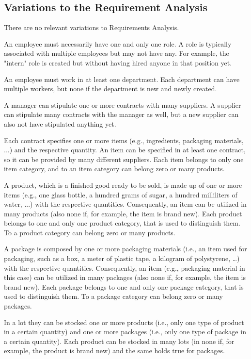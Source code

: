 \subsection{Variations to the Requirement Analysis}

There are no relevant variations to Requirements Analysis.

An employee must necessarily have one and only one role. A role is typically associated with multiple employees but may not have any. For example, the "intern" role is created but without having hired anyone in that position yet.

An employee must work in at least one department. Each department can have multiple workers, but none if the department is new and newly created.

A manager can stipulate one or more contracts with many suppliers. A supplier can stipulate many contracts with the manager as well, but a new supplier can also not have stipulated anything yet.

Each contract specifies one or more items (e.g., ingredients, packaging materials, ...) and the respective quantity. An item can be specified in at least one contract, so it can be provided by many different suppliers. Each item belongs to only one item category, and to an item category can belong zero or many products.

A product, which is a finished good ready to be sold, is made up of one or more items (e.g., one glass bottle, a hundred grams of sugar, a hundred milliliters of water, ...) with the respective quantities. Consequently, an item can be utilized in many products (also none if, for example, the item is brand new). Each product belongs to one and only one product category, that is used to distinguish them. To a product category can belong zero or many products.

A package is composed by one or more packaging materials (i.e., an item used for packaging, such as a box, a meter of plastic tape, a kilogram of polystyrene, …) with the respective quantities. Consequently, an item (e.g., packaging material in this case) can be utilized in many packages (also none if, for example, the item is brand new). Each package belongs to one and only one package category, that is used to distinguish them. To a package category can belong zero or many packages.

In a lot they can be stocked one or more products (i.e., only one type of product in a certain quantity) and one or more packages (i.e., only one type of package in a certain quantity). Each product can be stocked in many lots (in none if, for example, the product is brand new) and the same holds true for packages.

